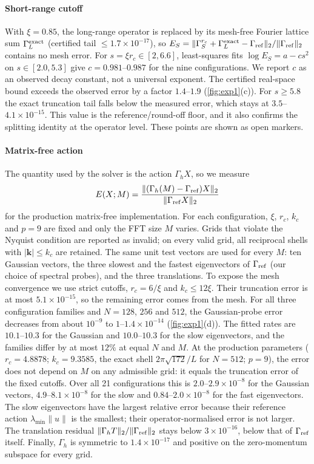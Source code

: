 \paragraph{Short-range cutoff}
With $\xi=0.85$, the long-range operator is replaced by its mesh-free Fourier lattice sum $\Gamma_L^{\rm exact}$
(certified tail $\le1.7\times10^{-17}$), so
$E_S=\|\Gamma_S^{r_c}+\Gamma_L^{\rm exact}-\Gamma_{\rm ref}\|_2/\|\Gamma_{\rm ref}\|_2$ contains no mesh error.
For $s=\xi r_c\in[2,6.6]$, least-squares fits $\log E_S=a-cs^2$ on $s\in[2.0,5.3]$ give $c=0.981$--$0.987$ for the
nine configurations. We report $c$ as an observed decay constant, not a universal exponent. The certified real-space
bound exceeds the observed error by a factor $1.4$--$1.9$ (\cref{fig:exp1}(c)).
For $s\ge5.8$ the exact truncation tail falls below the measured error, which stays at
$3.5$--$4.1\times10^{-15}$. This value is the reference/round-off floor, and it also confirms the splitting identity
at the operator level. These points are shown as open markers.

\paragraph{Matrix-free action}
The quantity used by the solver is the action $\Gamma_hX$, so we measure
\[
E(X;M)=\frac{\|(\Gamma_h(M)-\Gamma_{\rm ref})X\|_2}{\|\Gamma_{\rm ref}X\|_2}
\]
for the production matrix-free implementation. For each configuration, $\xi$, $r_c$, $k_c$ and $p=9$ are fixed and
only the FFT size $M$ varies. Grids that violate the Nyquist condition are reported as invalid; on every valid grid, all
reciprocal shells with $|\mathbf k|\le k_c$ are retained.
The same unit test vectors are used for every $M$: ten Gaussian vectors, the three slowest and the fastest eigenvectors
of $\Gamma_{\rm ref}$ (our choice of spectral probes), and the three translations.
To expose the mesh convergence we use strict cutoffs, $r_c=6/\xi$ and $k_c\le12\xi$. Their truncation error is at most
$5.1\times10^{-15}$, so the remaining error comes from the mesh.
For all three configuration families and $N=128$, $256$ and $512$, the Gaussian-probe error decreases from about
$10^{-9}$ to $1$--$1.4\times10^{-14}$ (\cref{fig:exp1}(d)). The fitted rates are $10.1$--$10.3$ for the Gaussian and
$10.0$--$10.3$ for the slow eigenvectors, and the families differ by at most $12\%$ at equal $N$ and $M$.
At the production parameters ($r_c=4.8878$; $k_c=9.3585$, the exact shell $2\pi\sqrt{172}/L$ for $N=512$; $p=9$), the
error does not depend on $M$ on any admissible grid: it equals the truncation error of the fixed cutoffs. Over all 21
configurations this is $2.0$--$2.9\times10^{-8}$ for the Gaussian vectors, $4.9$--$8.1\times10^{-8}$ for the slow and
$0.84$--$2.0\times10^{-8}$ for the fast eigenvectors.
The slow eigenvectors have the largest relative error because their reference action $\lambda_{\min}\|u\|$ is the
smallest; their operator-normalised error is not larger.
The translation residual $\|\Gamma_hT\|_2/\|\Gamma_{\rm ref}\|_2$ stays below $3\times10^{-16}$, below that of
$\Gamma_{\rm ref}$ itself. Finally, $\Gamma_h$ is symmetric to $1.4\times10^{-17}$ and positive on the zero-momentum
subspace for every grid.

